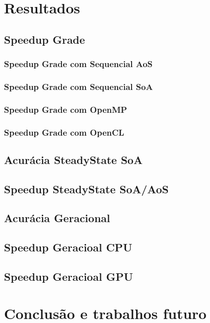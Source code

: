 \chapter{Resultados}
\section{Speedup Grade}
\subsection{Speedup Grade com Sequencial AoS}
\subsection{Speedup Grade com Sequencial SoA}
\subsection{Speedup Grade com OpenMP}
\subsection{Speedup Grade com OpenCL}

\section{Acurácia SteadyState SoA}
\section{Speedup SteadyState SoA/AoS}
\section{Acurácia Geracional}
\section{Speedup Geracioal CPU}
\section{Speedup Geracioal GPU}


\chapter{Conclusão e trabalhos futuro}